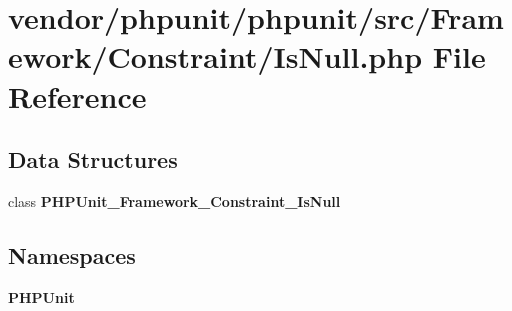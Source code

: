 \section{vendor/phpunit/phpunit/src/\+Framework/\+Constraint/\+Is\+Null.php File Reference}
\label{_is_null_8php}
\subsection*{Data Structures}
\begin{DoxyCompactItemize}
\item 
class {\bf P\+H\+P\+Unit\+\_\+\+Framework\+\_\+\+Constraint\+\_\+\+Is\+Null}
\end{DoxyCompactItemize}
\subsection*{Namespaces}
\begin{DoxyCompactItemize}
\item 
 {\bf P\+H\+P\+Unit}
\end{DoxyCompactItemize}
